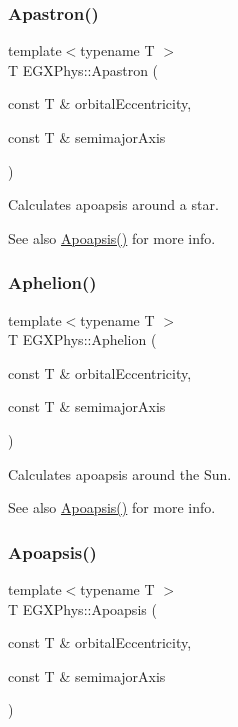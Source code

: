 \subsubsection{\texorpdfstring{Apastron()}{Apastron()}}
{\footnotesize\ttfamily template$<$typename T $>$ \\
T E\+G\+X\+Phys\+::\+Apastron (\begin{DoxyParamCaption}\item[{const T \&}]{orbital\+Eccentricity,  }\item[{const T \&}]{semimajor\+Axis }\end{DoxyParamCaption})}



Calculates apoapsis around a star. 

\begin{DoxySeeAlso}{See also}
\mbox{\hyperlink{group___e_g_x_phys-_apoapsis_gaf962e650bf84a568458e8eb39b1c61ba}{Apoapsis()}} for more info. 
\end{DoxySeeAlso}
\mbox{\label{group___e_g_x_phys-_apoapsis_ga77dadb4d082a441c8e85203c983722c7}} 
\subsubsection{\texorpdfstring{Aphelion()}{Aphelion()}}
{\footnotesize\ttfamily template$<$typename T $>$ \\
T E\+G\+X\+Phys\+::\+Aphelion (\begin{DoxyParamCaption}\item[{const T \&}]{orbital\+Eccentricity,  }\item[{const T \&}]{semimajor\+Axis }\end{DoxyParamCaption})}



Calculates apoapsis around the Sun. 

\begin{DoxySeeAlso}{See also}
\mbox{\hyperlink{group___e_g_x_phys-_apoapsis_gaf962e650bf84a568458e8eb39b1c61ba}{Apoapsis()}} for more info. 
\end{DoxySeeAlso}
\mbox{\label{group___e_g_x_phys-_apoapsis_gaf962e650bf84a568458e8eb39b1c61ba}} 
\subsubsection{\texorpdfstring{Apoapsis()}{Apoapsis()}}
{\footnotesize\ttfamily template$<$typename T $>$ \\
T E\+G\+X\+Phys\+::\+Apoapsis (\begin{DoxyParamCaption}\item[{const T \&}]{orbital\+Eccentricity,  }\item[{const T \&}]{semimajor\+Axis }\end{DoxyParamCaption})}



